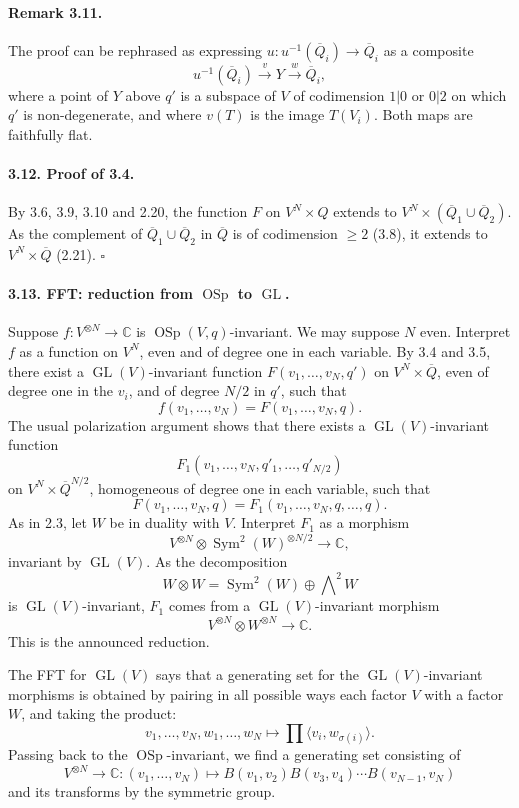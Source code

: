 \documentclass[11pt]{article}
\newcommand{\C}{\mathbb C}
\newcommand{\GL}{\operatorname{GL}}
\newcommand{\OSp}{\operatorname{OSp}}
\newcommand{\Sym}{\operatorname{Sym}}
\newcommand{\barQ}{\overline Q}
\begin{document}
\paragraph{Remark 3.11.}
The proof can be rephrased as expressing $u:u^{-1}(\barQ_i)\to\barQ_i$ as a composite
\[
u^{-1}(\barQ_i)\xrightarrow{v}Y\xrightarrow{w}\barQ_i,
\]
where a point of $Y$ above $q'$ is a subspace of $V$ of codimension $1|0$ or $0|2$ on which $q'$ is non-degenerate, and where $v(T)$ is the image $T(V_i)$. Both maps are faithfully flat.

\paragraph{3.12. Proof of 3.4.}
By 3.6, 3.9, 3.10 and 2.20, the function $F$ on $V^N\times Q$ extends to $V^N\times(\barQ_1\cup\barQ_2)$. As the complement of $\barQ_1\cup\barQ_2$ in $\barQ$ is of codimension $\geq2$ (3.8), it extends to $V^N\times\barQ$ (2.21). \hfill $\square$

\paragraph{3.13. FFT: reduction from $\OSp$ to $\GL$.}
Suppose $f:V^{\otimes N}\to\C$ is $\OSp(V,q)$-invariant. We may suppose $N$ even. Interpret $f$ as a function on $V^N$, even and of degree one in each variable. By 3.4 and 3.5, there exist a $\GL(V)$-invariant function $F(v_1,\ldots,v_N,q')$ on $V^N\times\barQ$, even of degree one in the $v_i$, and of degree $N/2$ in $q'$, such that
\[
f(v_1,\ldots,v_N)=F(v_1,\ldots,v_N,q).
\]
The usual polarization argument shows that there exists a $\GL(V)$-invariant function
\[
F_1(v_1,\ldots,v_N,q'_1,\ldots,q'_{N/2})
\]
on $V^N\times\barQ^{N/2}$, homogeneous of degree one in each variable, such that
\[
F(v_1,\ldots,v_N,q)=F_1(v_1,\ldots,v_N,q,\ldots,q).
\]
As in 2.3, let $W$ be in duality with $V$. Interpret $F_1$ as a morphism
\[
V^{\otimes N}\otimes \Sym^2(W)^{\otimes N/2}\longrightarrow \C,
\]
invariant by $\GL(V)$. As the decomposition
\[
W\otimes W=\Sym^2(W)\oplus\bigwedge\nolimits^2 W
\]
is $\GL(V)$-invariant, $F_1$ comes from a $\GL(V)$-invariant morphism
\[
V^{\otimes N}\otimes W^{\otimes N}\longrightarrow \C.
\]
This is the announced reduction.

The FFT for $\GL(V)$ says that a generating set for the $\GL(V)$-invariant morphisms is obtained by pairing in all possible ways each factor $V$ with a factor $W$, and taking the product:
\[
v_1,\ldots,v_N,w_1,\ldots,w_N\longmapsto\prod \langle v_i,w_{\sigma(i)}\rangle.
\]
Passing back to the $\OSp$-invariant, we find a generating set consisting of
\[
V^{\otimes N}\to\C:
(v_1,\ldots,v_N)\longmapsto B(v_1,v_2)B(v_3,v_4)\cdots B(v_{N-1},v_N)
\]
and its transforms by the symmetric group.
\end{document}
